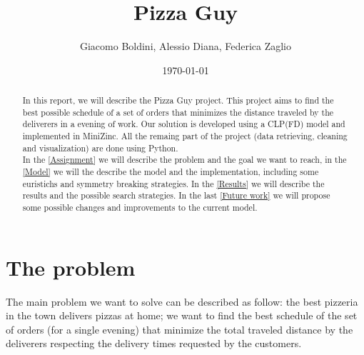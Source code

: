 \documentclass[10pt]{article}
\title{Pizza Guy}
\date{\today}
\author{Giacomo Boldini, Alessio Diana, Federica Zaglio}
\begin{document}
	\maketitle

	\begin{abstract}

		In this report, we will describe the Pizza Guy project. This project 
		aims to find the best possible schedule of a set of orders that
		minimizes the distance traveled by the deliverers in a evening of 
		work. Our solution is developed using a CLP(FD) model and implemented 
		in MiniZinc. All the remaing part of the project (data retrieving, cleaning
		and visualization) are done using Python.\\	
		In the \cref{Assignment} we will describe the problem and the goal
		we want to reach, in the \cref{Model} we will the describe the 
		model and the implementation, including some euristichs and symmetry breaking
		strategies. In the \cref{Results} we will describe the results and
		the possible search strategies. In the last \cref{Future work} we 
		will propose some possible changes and improvements to the current model.
		
	\end{abstract}

	{
\small
	\tableofcontents

	}

	\pagebreak

	\section{The problem}
	\label{Assignment}
	The main problem we want to solve can be described as follow: the best pizzeria in the 
	town delivers pizzas at home; we want to find the best schedule of the set of orders 
	(for a single evening) that minimize the total traveled distance by the deliverers 
	respecting the delivery times requested by the customers.
	
\end{document}
